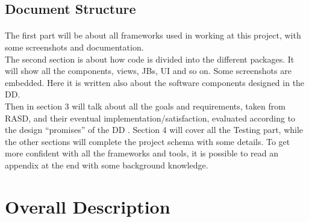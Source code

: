 \documentclass{article}
\begin{document}
		\subsection{Document Structure}
		\paragraph{}
The first part will be about all frameworks used in working at this project, with some screenshots and documentation. \\
The second section is about how code is divided into the different packages. It will show all the components, views, JBs, UI and so on. Some screenshots are embedded. Here it is written also about the software components designed in the DD.\\
Then in section 3 will talk about all the goals and requirements, taken from RASD, and their eventual implementation/satisfaction, evaluated according to the design “promises” of the DD . Section 4 will cover all the Testing part, while the other sections will complete the project schema with some details. To get more confident with all the frameworks and tools, it is possible to read an appendix at the end  with some background knowledge.

\newpage
	\section{Overall Description}
\end{document}
